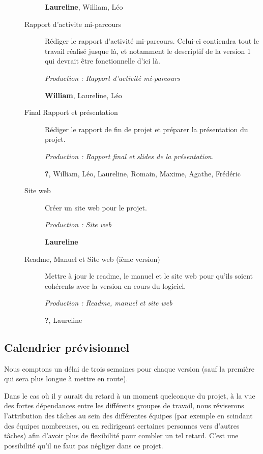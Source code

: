 \documentclass{article}
\begin{document}
\begin{description}
\begin{description}
    \textbf{Laureline}, William, Léo

  \item[Rapport d'activite mi-parcours] Rédiger le rapport d'activité mi-parcours. Celui-ci contiendra tout le travail réalisé jusque là, 
et notamment le descriptif de la version 1 qui devrait être fonctionnelle d'ici là.

    \textit{Production : Rapport d'activité mi-parcours}

    \textbf{William}, Laureline, Léo

  \item[Final Rapport et présentation] Rédiger le rapport de fin de projet et préparer la présentation du projet.

    \textit{Production : Rapport final et slides de la présentation.}

    \textbf{?}, William, Léo, Laureline, Romain, Maxime, Agathe, Frédéric

  \item[Site web] Créer un site web pour le projet. %

    \textit{Production : Site web}

    \textbf{Laureline}

  \item[Readme, Manuel et Site web (ième version)] Mettre à jour le readme, le manuel et le site web pour qu'ils soient cohérents avec la 
version en cours du logiciel.

    \textit{Production : Readme, manuel et site web}

    \textbf{?}, Laureline
  \end{description}

\medskip

\end{description}


\subsection{\label{calendrier}Calendrier prévisionnel}

Nous comptons un délai de trois semaines pour chaque version (sauf la première qui sera plus longue à mettre en route).

Dans le cas où il y aurait du retard à un moment quelconque du projet, à la vue des fortes dépendances entre les différents groupes de 
travail, nous réviserons l'attribution des tâches au sein des différentes équipes (par exemple en scindant des équipes nombreuses, ou en 
redirigeant certaines personnes vers d'autres tâches) afin d'avoir plus de flexibilité pour combler un tel retard. C'est une possibilité 
qu'il ne faut pas négliger dans ce projet.
\end{document}
